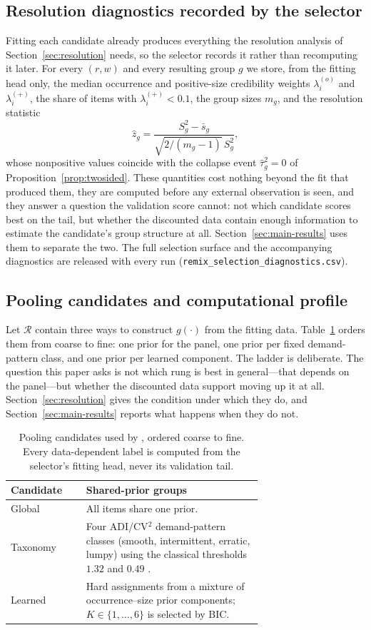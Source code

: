 \subsection{Resolution diagnostics recorded by the selector}
Fitting each candidate already produces everything the resolution
analysis of Section~\ref{sec:resolution} needs, so the selector records it
rather than recomputing it later. For every $(r,w)$ and every resulting
group $g$ we store, from the fitting head only, the median occurrence and
positive-size credibility weights $\lambda_i^{(o)}$ and $\lambda_i^{(+)}$,
the share of items with $\lambda_i^{(+)}<0.1$, the group sizes $m_g$, and
the resolution statistic
\[
\hat z_g=\frac{S_g^2-\bar s_g}{\sqrt{2/(m_g-1)}\,S_g^2},
\]
whose nonpositive values coincide with the collapse event
$\hat\tau_g^2=0$ of Proposition~\ref{prop:twosided}. These quantities cost
nothing beyond the fit that produced them, they are computed before any
external observation is seen, and they answer a question the validation
score cannot: not which candidate scores best on the tail, but whether the
discounted data contain enough information to estimate the candidate's
group structure at all. Section~\ref{sec:main-results} uses them to
separate the two. The full selection surface and the accompanying
diagnostics are released with every run
(\texttt{remix\_selection\_diagnostics.csv}).


\subsection{Pooling candidates and computational profile}
Let $\mathcal R$ contain three ways to construct $g(\cdot)$ from the
fitting data. Table~\ref{tab:pool-candidates} orders them from coarse to
fine: one prior for the panel, one prior per fixed demand-pattern class,
and one prior per learned component. The ladder is deliberate. The
question this paper asks is not which rung is best in general---that
depends on the panel---but whether the discounted data support moving up
it at all. Section~\ref{sec:resolution} gives the condition under which
they do, and Section~\ref{sec:main-results} reports what happens when they
do not.

\begin{table}[t]
\centering
\caption{Pooling candidates used by \EBB{}, ordered coarse to fine.
Every data-dependent label is computed from the selector's fitting head,
never its validation tail.}
\label{tab:pool-candidates}
\small
\setlength{\tabcolsep}{3.5pt}
\begin{tabular}{lp{0.70\linewidth}}
\toprule
Candidate & Shared-prior groups\\
\midrule
Global & All items share one prior.\\
Taxonomy & Four ADI/CV$^2$ demand-pattern classes (smooth, intermittent,
erratic, lumpy) using the classical thresholds $1.32$ and $0.49$
\citep{syntetos2005categorization}.\\
Learned & Hard assignments from a mixture of occurrence--size prior
components; $K\in\{1,\ldots,6\}$ is selected by BIC.\\
\bottomrule
\end{tabular}
\end{table}

